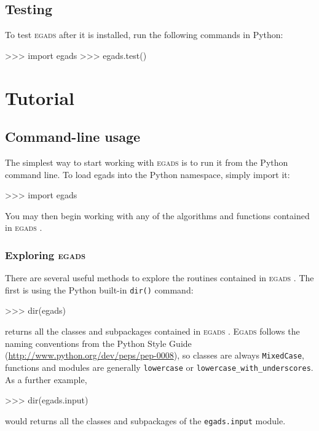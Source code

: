 \documentclass[a4paper,11pt]{report}
\newcommand{\egads}{\textsc{egads} }
\newcommand{\Egads}{\textsc{Egads} }
\begin{document}
\section{Testing}

To test \egads after it is installed, run the following commands in Python:

\begin{command}
   >>> import egads
   >>> egads.test()
\end{command} 

\chapter{Tutorial}

\section{Command-line usage}
The simplest way to start working with \egads is to run it from the Python command line. 
To load egads into the Python namespace, simply import it:

\begin{command}
    >>> import egads
\end{command}
You may then begin working with any of the algorithms and functions contained in \egads.

\subsection{Exploring \egads}
There are several useful methods to explore the routines contained in \egads. 
The first is using the Python built-in \verb|dir()| command:

\begin{command}
    >>> dir(egads)
\end{command}
returns all the classes and subpackages contained in \egads. \Egads follows the 
naming conventions from the Python Style Guide (\href{http://www.python.org/dev/peps/pep-0008}{http://www.python.org/dev/peps/pep-0008}), 
so classes are always \verb|MixedCase|, functions and modules are 
generally \verb|lowercase| or \verb|lowercase_with_underscores|. As a further example,

\begin{command}
    >>> dir(egads.input)
\end{command}
would returns all the classes and subpackages of the \verb|egads.input| module.
\end{document}
